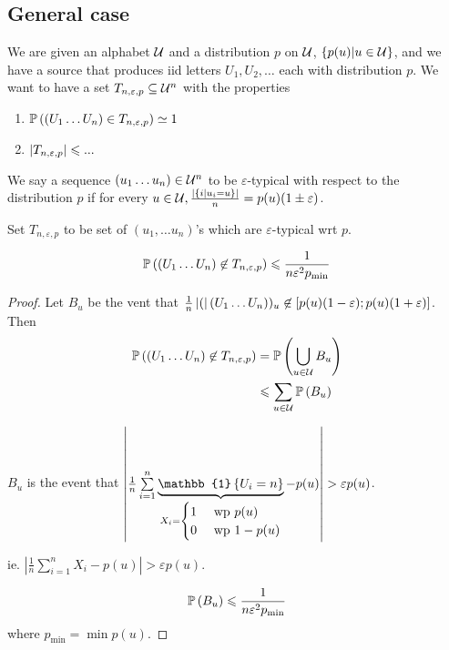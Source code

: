 \subsection{General case}

We are given an alphabet $\mathcal{U}$ and a distribution $p$ on $\mathcal{U}$, $\left\{ p(u) \vert u\in\mathcal{U} \right\}$, and we have a source that produces iid letters $U_1,U_2,\ldots$ each with distribution $p$. We want to have a set $T_{n,\varepsilon, p} \subseteq \mathcal{U}^n$ with the properties
\begin{enumerate}
    \item $\mathbb{P}\left( (U_1\ldots U_n) \in T_{n,\varepsilon,p} \right) \simeq 1$
    \item $\left\lvert T_{n,\varepsilon,p}\right\rvert \leqslant ...$
\end{enumerate}

We say a sequence $(u_1\ldots u_n) \in \mathcal{U}^n$ to be $\varepsilon$-typical with respect to the distribution $p$ if for every $u\in\mathcal{U}, \frac{\left\lvert\left\{ i \vert u_i = u \right\}\right\rvert}{n} = p(u) (1\pm \varepsilon)$.

Set $T_{n,\varepsilon, p}$ to be set of $(u_1,\ldots u_n)$'s which are $\varepsilon$-typical wrt $p$.

\begin{proposition}
    \[
        \mathbb{P}\left( (U_1\ldots U_n) \not\in T_{n,\varepsilon,p} \right) \leqslant \frac{1}{n \varepsilon^2p_{\min}}
    \]
\end{proposition}
\begin{proof}
    Let $B_u$ be the vent that $\frac{1}{n}\left\lvert(\right\rvert(U_1\ldots U_n))_u \not\in [p(u)(1-\varepsilon); p(u)(1+\varepsilon)]$. Then 
    \[
        \begin{aligned}
            \mathbb{P}\left( (U_1\ldots U_n) \not\in T_{n,\varepsilon,p} \right) &= \mathbb{P}\left( \bigcup\limits_{u\in\mathcal{U}} B_u \right)\\
            &\leqslant \sum\limits_{u\in\mathcal{U}} \mathbb{P}\left( B_u \right)
        \end{aligned}
    \]
    
    $B_u$ is the event that $\left\lvert \frac{1}{n} \sum\limits_{i=1}^n \underbrace{\mathbb{1}\set{U_i = n}}_{X_i = \begin{cases}
    1 & \text{ wp } p(u)\\
    0 & \text{ wp } 1-p(u)
    \end{cases}} - p(u) \right\rvert > \varepsilon p(u)$.
    
    ie. $\left\lvert \frac{1}{n} \sum\limits_{i=1}^n X_i - p(u) \right\rvert > \varepsilon p(u)$.
    
    \[
        \mathbb{P}\left( B_u \right) \leqslant \frac{1}{n\varepsilon^2 p_{\min}}
    \]
    where $p_{\min} = \min p(u)$.
\end{proof}

